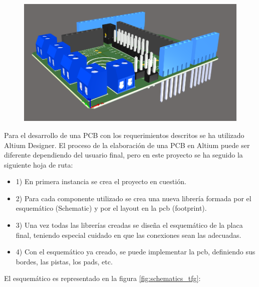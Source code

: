	\begin{center}
		\begin{figure}[H]
			\center
			\includegraphics[scale=0.8]{imagenes/Balancing_Robot/Vista3D2.PNG}
			\caption{}
			\label{fig:Vista3D2}
		\end{figure}
	\end{center}


Para el desarrollo de una PCB con los requerimientos descritos se ha utilizado Altium Designer. El proceso de la elaboración de una PCB en Altium puede ser diferente dependiendo del usuario final, pero en este proyecto se ha seguido la siguiente hoja de ruta:

\begin{itemize}
	\item 1) En primera instancia se crea el proyecto en cuestión.
	\item 2) Para cada componente utilizado se crea una nueva librería formada por el esquemático (Schematic) y por el layout en la pcb (footprint).
	\item 3) Una vez todas las librerías creadas se diseña el esquemático de la placa final, teniendo especial cuidado en que las conexiones sean las adecuadas.
	\item 4) Con el esquemático ya creado, se puede implementar la pcb, definiendo sus bordes, las pistas, los pads, etc.
\end{itemize}

El esquemático es representado en la figura \ref{fig:schematics_tfg}: 
\newpage

